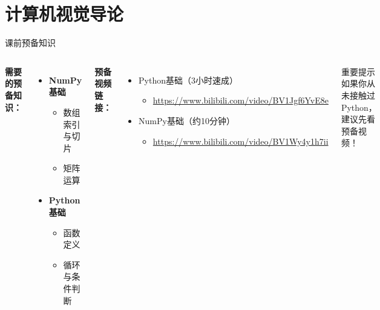 
\section{计算机视觉导论}

\begin{frame}{课前预备知识}
    \begin{columns}
        \textbf{需要的预备知识：}
        \begin{itemize}
            \item \textbf{NumPy基础}
            \begin{itemize}
                \item 数组索引与切片
                \item 矩阵运算
            \end{itemize}
            \item \textbf{Python基础}
            \begin{itemize}
                \item 函数定义
                \item 循环与条件判断
            \end{itemize}
        \end{itemize}

        \textbf{预备视频链接：}
        \begin{itemize}
            \item Python基础（3小时速成）
            \begin{itemize}
                \item \footnotesize \url{https://www.bilibili.com/video/BV1Jgf6YvE8e}
            \end{itemize}
            \item NumPy基础（约10分钟）
            \begin{itemize}
                \item \footnotesize \url{https://www.bilibili.com/video/BV1Wy4y1h7ii}
            \end{itemize}
        \end{itemize}

        \vspace{0.5cm}
        \begin{alertblock}{重要提示}
            如果你从未接触过Python，建议先看预备视频！
        \end{alertblock}
    \end{columns}
\end{frame}

